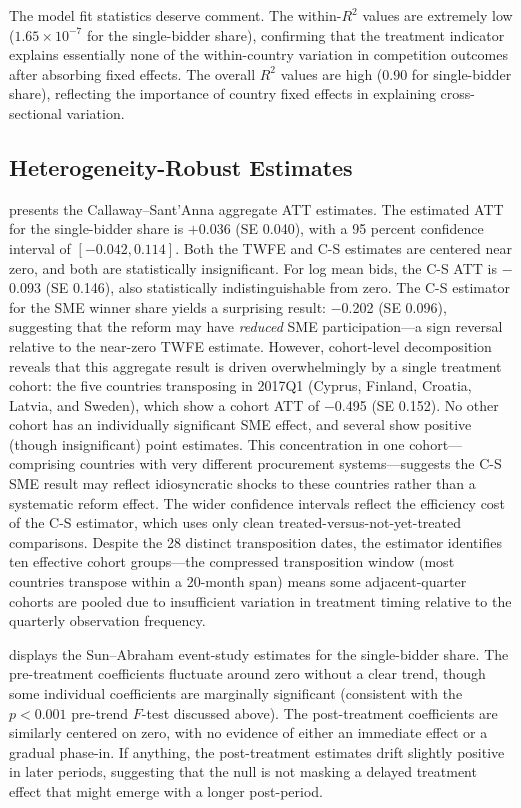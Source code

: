 \documentclass[12pt]{article}
\begin{document}
The model fit statistics deserve comment. The within-$R^2$ values are extremely low ($1.65 \times 10^{-7}$ for the single-bidder share), confirming that the treatment indicator explains essentially none of the within-country variation in competition outcomes after absorbing fixed effects. The overall $R^2$ values are high (0.90 for single-bidder share), reflecting the importance of country fixed effects in explaining cross-sectional variation.

\subsection{Heterogeneity-Robust Estimates}

 presents the Callaway--Sant'Anna aggregate ATT estimates. The estimated ATT for the single-bidder share is $+$0.036 (SE 0.040), with a 95 percent confidence interval of $[-0.042, 0.114]$. Both the TWFE and C-S estimates are centered near zero, and both are statistically insignificant. For log mean bids, the C-S ATT is $-$0.093 (SE 0.146), also statistically indistinguishable from zero. The C-S estimator for the SME winner share yields a surprising result: $-$0.202 (SE 0.096), suggesting that the reform may have \textit{reduced} SME participation---a sign reversal relative to the near-zero TWFE estimate. However, cohort-level decomposition reveals that this aggregate result is driven overwhelmingly by a single treatment cohort: the five countries transposing in 2017Q1 (Cyprus, Finland, Croatia, Latvia, and Sweden), which show a cohort ATT of $-$0.495 (SE 0.152). No other cohort has an individually significant SME effect, and several show positive (though insignificant) point estimates. This concentration in one cohort---comprising countries with very different procurement systems---suggests the C-S SME result may reflect idiosyncratic shocks to these countries rather than a systematic reform effect. The wider confidence intervals reflect the efficiency cost of the C-S estimator, which uses only clean treated-versus-not-yet-treated comparisons. Despite the 28 distinct transposition dates, the estimator identifies ten effective cohort groups---the compressed transposition window (most countries transpose within a 20-month span) means some adjacent-quarter cohorts are pooled due to insufficient variation in treatment timing relative to the quarterly observation frequency.



 displays the Sun--Abraham event-study estimates for the single-bidder share. The pre-treatment coefficients fluctuate around zero without a clear trend, though some individual coefficients are marginally significant (consistent with the $p < 0.001$ pre-trend $F$-test discussed above). The post-treatment coefficients are similarly centered on zero, with no evidence of either an immediate effect or a gradual phase-in. If anything, the post-treatment estimates drift slightly positive in later periods, suggesting that the null is not masking a delayed treatment effect that might emerge with a longer post-period.
\end{document}
